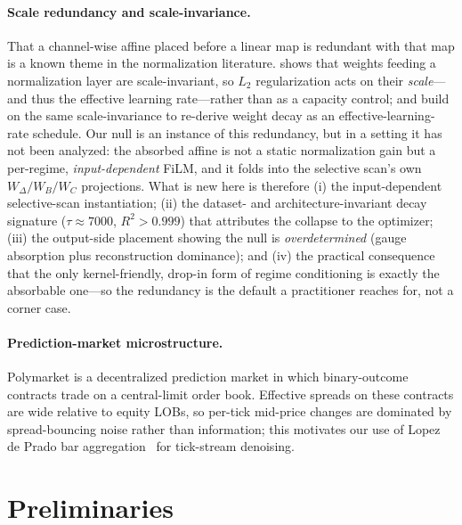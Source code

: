 \documentclass{article}
\begin{document}
\paragraph{Scale redundancy and scale-invariance.}
That a channel-wise affine placed before a linear map is redundant with that
map is a known theme in the normalization literature.
\citet{vanlaarhoven2017l2} shows that weights feeding a normalization layer are
scale-invariant, so $L_2$ regularization acts on their \emph{scale}---and thus
the effective learning rate---rather than as a capacity control;
\citet{hoffer2018norm} and \citet{li2020exp} build on the same scale-invariance
to re-derive weight decay as an effective-learning-rate schedule.  Our null is
an instance of this redundancy, but in a setting it has not been analyzed: the
absorbed affine is not a static normalization gain but a per-regime,
\emph{input-dependent} FiLM, and it folds into the selective scan's own
$W_\Delta/W_B/W_C$ projections.  What is new here is therefore (i) the
input-dependent selective-scan instantiation; (ii) the dataset- and
architecture-invariant decay signature ($\tau\approx7000$, $R^2>0.999$) that
attributes the collapse to the optimizer; (iii) the output-side placement
showing the null is \emph{overdetermined} (gauge absorption plus reconstruction
dominance); and (iv) the practical consequence that the only kernel-friendly,
drop-in form of regime conditioning is exactly the absorbable one---so the
redundancy is the default a practitioner reaches for, not a corner case.

\paragraph{Prediction-market microstructure.}
Polymarket is a decentralized prediction market in which binary-outcome
contracts trade on a central-limit order book.  Effective spreads on
these contracts are wide relative to equity LOBs, so per-tick mid-price
changes are dominated by spread-bouncing noise rather than information;
this motivates our use of Lopez de Prado bar
aggregation~\citep{deprado2018advances} for tick-stream denoising.

\section{Preliminaries}\label{sec:prelim}
\end{document}
